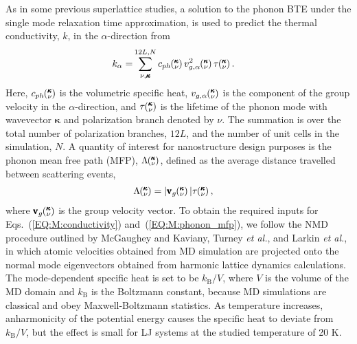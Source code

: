 \documentclass[aps,prb,preprint,preprintnumbers,amsmath,amssymb,floatfix,superscriptaddress]{revtex4}
\newcommand{\kv}{\mspace{-4.0mu}\left(\mspace{-8.0mu}
\begin{smallmatrix}&\pmb{\kappa} \\&\nu\end{smallmatrix}
\mspace{-3.0mu}\right)}
\begin{document}
As in some previous superlattice studies, \cite{Luckyanova16112012,doi:10.1021/nl202186y} a solution to the phonon BTE under the single mode relaxation time approximation,\cite{ziman_electrons_2001} is used to predict the thermal conductivity, $k$, in the $\alpha$-direction from
\begin{equation}\label{EQ:M:conductivity}
\begin{split}
k_{\mathbf{\alpha}}=&\sum_{\nu,\pmb{\kappa}}^{12L,N} c_{ph}\kv
v^{2}_{g,\mathbf{\alpha}}\kv \tau\kv.
\end{split}
\end{equation}
Here, $c_{ph}\kv$ is the volumetric specific heat, $v_{g,\mathbf{\alpha}}\kv$ is the component of the group velocity in the $\alpha$-direction, and $\tau\kv$ is the lifetime of the phonon mode with wavevector $\pmb{\kappa}$ and polarization branch denoted by $\nu$. The summation is over the total number of polarization branches, $12L$, and the number of unit cells in the simulation, $N$. A quantity of interest for nanostructure design purposes \cite{PhysRevB.87.035437} is the phonon mean free path (MFP), $\Lambda\kv$, defined as the average distance travelled between scattering events, \cite{ziman_electrons_2001}
\begin{equation}\label{EQ:M:phonon_mfp}
\begin{split}
\Lambda\kv &= |\pmb{\mathrm{v}}_{g}\kv | \tau\kv,
\end{split}
\end{equation}
where $\pmb{\mathrm{v}}_{g}\kv$ is the group velocity vector. To obtain the required inputs for Eqs.~(\ref{EQ:M:conductivity}) and~(\ref{EQ:M:phonon_mfp}), we follow the NMD procedure outlined by McGaughey and Kaviany,\cite{PhysRevB.71.184305} Turney \textit{et al.},\cite {PhysRevB.79.064301} and Larkin \textit{et al.},\cite{jason_inpress} in which atomic velocities obtained from MD simulation are projected onto the normal mode eigenvectors obtained from harmonic lattice dynamics calculations. The mode-dependent specific heat is set to be $k_\mathrm{B}/V$, where $V$ is the volume of the MD domain and $k_\mathrm{B}$ is the Boltzmann constant, because MD simulations are classical and obey Maxwell-Boltzmann statistics. As temperature increases, anharmonicity of the potential energy causes the specific heat to deviate from $k_\mathrm{B}/V$, but the effect is small for LJ systems at the studied temperature of 20 K.\cite{PhysRevB.71.184305} 
\end{document}
